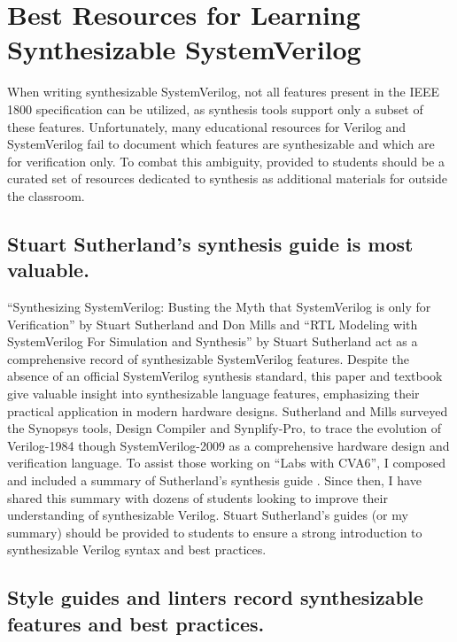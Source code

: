 
\chapter{Best Resources for Learning Synthesizable SystemVerilog}
\label{chapter:resources}

When writing synthesizable SystemVerilog, not all features present in the IEEE 1800 specification can be utilized, as synthesis tools support only a subset of these features.
Unfortunately, many educational resources for Verilog and SystemVerilog fail to document which features are synthesizable and which are for verification only.
To combat this ambiguity, provided to students should be a curated set of resources dedicated to synthesis as additional materials for outside the classroom.

\section{Stuart Sutherland's synthesis guide is most valuable.}

\enquote{Synthesizing SystemVerilog: Busting the Myth that SystemVerilog is only for Verification} by Stuart Sutherland and Don Mills \cite{sutherland} and \enquote{RTL Modeling with SystemVerilog For Simulation and Synthesis} by Stuart Sutherland \cite{sutherland:book} act as a comprehensive record of synthesizable SystemVerilog features.
Despite the absence of an official SystemVerilog synthesis standard, this paper and textbook give valuable insight into synthesizable language features, emphasizing their practical application in modern hardware designs.
Sutherland and Mills surveyed the Synopsys tools, Design Compiler and Synplify-Pro, to trace the evolution of Verilog-1984 though SystemVerilog-2009 as a comprehensive hardware design and verification language.
To assist those working on \enquote{Labs with CVA6}, I composed and included a summary of Sutherland's synthesis guide \cite{labsWithCVA6}.
Since then, I have shared this summary with dozens of students looking to improve their understanding of synthesizable Verilog.
Stuart Sutherland's guides (or my summary) should be provided to students to ensure a strong introduction to synthesizable Verilog syntax and best practices.

\section{Style guides and linters record synthesizable features and best practices.}
\label{section:style_guides}

